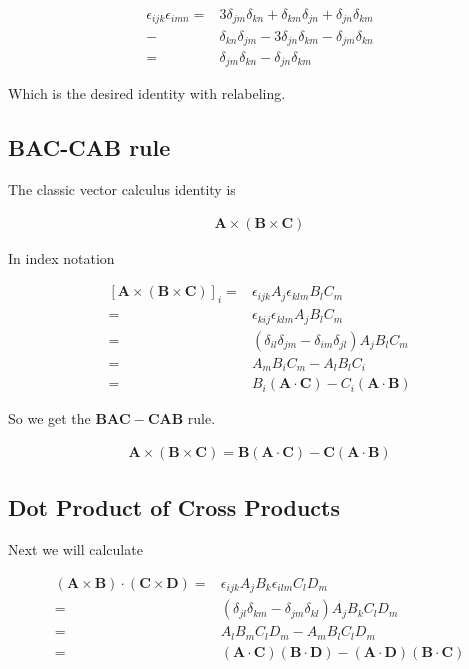 \documentclass[12pt]{article}
\newcommand{\ep}{\epsilon}
\renewcommand{\vec}[1]{\boldsymbol{#1}}
\begin{document}
\begin{align}
\ep_{ijk}\ep_{imn} = &3\delta_{jm}\delta_{kn} + \delta_{km}\delta_{jn} + \delta_{jn}\delta_{km}\\
-& \delta_{kn}\delta_{jm} - 3\delta_{jn}\delta_{km} - \delta_{jm}\delta_{kn}\\
=& \delta_{jm}\delta_{kn} - \delta_{jn}\delta_{km}
\end{align}

Which is the desired identity with relabeling.

\subsection{BAC-CAB rule}

The classic vector calculus identity is

\begin{align}
\vec{A}\times(\vec{B}\times\vec{C})
\end{align}

In index notation

\begin{align}
\left[\vec{A}\times(\vec{B}\times\vec{C})\right]_i =& \ep_{ijk}A_j\ep_{klm}B_lC_m\\
=&\ep_{kij}\ep_{klm} A_jB_lC_m\\
=& (\delta_{il}\delta_{jm} - \delta_{im}\delta_{jl}) A_jB_lC_m\\
=& A_m B_i C_m - A_l B_l C_i\\
=& B_i (\vec{A}\cdot\vec{C}) - C_i (\vec{A}\cdot\vec{B})
\end{align}

So we get the $\vec{BAC}-\vec{CAB}$ rule.

\begin{align}
\vec{A}\times(\vec{B}\times\vec{C}) = \vec{B}(\vec{A}\cdot\vec{C}) - \vec{C}(\vec{A}\cdot\vec{B})
\end{align}

\subsection{Dot Product of Cross Products}
Next we will calculate

\begin{align}
(\vec{A}\times\vec{B})\cdot(\vec{C}\times\vec{D}) =& \ep_{ijk}A_jB_k\ep_{ilm}C_lD_m\\
=&(\delta_{jl}\delta_{km} - \delta_{jm}\delta_{kl})A_jB_kC_lD_m\\
=&A_lB_mC_lD_m - A_mB_lC_lD_m\\
=& (\vec{A}\cdot\vec{C})(\vec{B}\cdot\vec{D}) - (\vec{A}\cdot\vec{D})(\vec{B}\cdot\vec{C})
\end{align}
\end{document}
